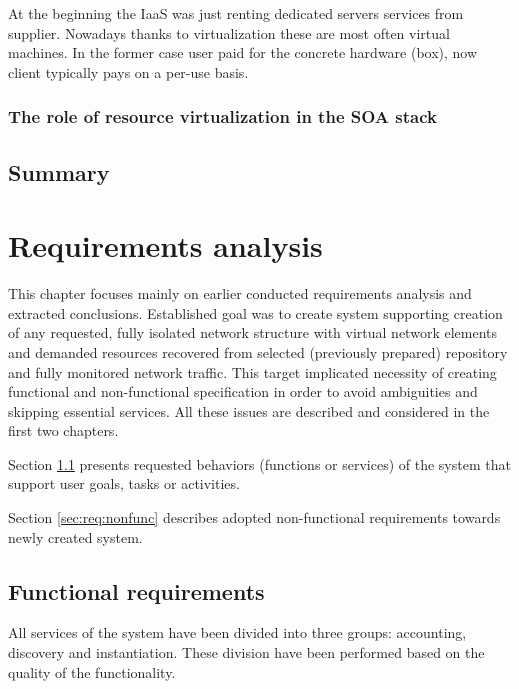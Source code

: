 \documentclass[11pt]{book}
\begin{document}
        At the beginning the IaaS was just renting dedicated servers services from supplier. Nowadays thanks to
        virtualization these are most often virtual machines. In the former case user paid for the concrete hardware
        (box), now client typically pays on a per-use basis.


      \subsection{The role of resource virtualization in the SOA stack}


    \section*{Summary}


  \chapter{Requirements analysis}

    This chapter focuses mainly on earlier conducted requirements analysis and extracted conclusions. Established goal
    was to create system supporting creation of any requested, fully isolated network structure with virtual network
    elements and demanded resources recovered from selected (previously prepared) repository and fully monitored network
    traffic. This target implicated necessity of creating functional and non-functional specification in order to avoid
    ambiguities and skipping essential services. All these issues are described and considered in the first two
    chapters.

    Section \ref{sec:req:func} presents requested behaviors (functions or services) of the system that support user
    goals, tasks or activities.

    Section \ref{sec:req:nonfunc} describes adopted non-functional requirements towards newly created system.


    \section{Functional requirements}
	
		\label{sec:req:func}
		
		All services of the system have been divided into three groups: accounting, discovery and instantiation.
                These division have been performed based on the quality of the functionality.  
\end{document}

